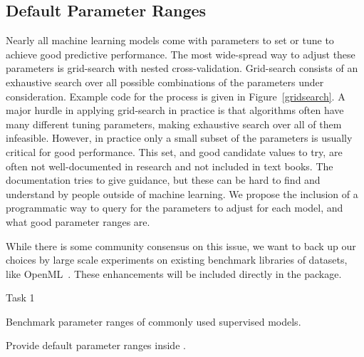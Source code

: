 \subsection{Default Parameter Ranges}
Nearly all machine learning models come with parameters to set or tune
to achieve good predictive performance. The most wide-spread way to adjust
these parameters is grid-search with nested cross-validation.
Grid-search consists of an exhaustive search over all possible combinations
of the parameters under consideration. Example code for the process is given
in Figure~\ref{gridsearch}.
A major hurdle in applying grid-search in practice is that algorithms
often have many different tuning parameters, making exhaustive search
over all of them infeasible. However, in practice only a small subset
of the parameters is usually critical for good performance. This set,
and good candidate values to try, are often not well-documented in research and
not included in text books.
The \sklearn{} documentation tries to give guidance, but these can be hard
to find and understand by people outside of machine learning.
We propose the inclusion of a programmatic way to query for the parameters
to adjust for each model, and what good parameter ranges are.

While there is some community consensus on this issue, we want to back
up our choices by large scale experiments on existing benchmark libraries
of datasets, like OpenML~\autocite{van2013openml}. These enhancements will
be included directly in the \sklearn{} package.
\begin{labeling}{Task 1}
    \item [Task 1] Benchmark parameter ranges of commonly used supervised models.
    \item [Task 2] Provide default parameter ranges inside \sklearn{}.
\end{labeling}

